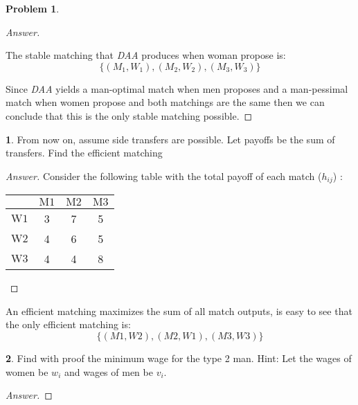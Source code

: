\documentclass{article}
\theoremstyle{definition}
\newtheorem{problem}{Problem}
\newtheorem{subproblem}{}[problem]
\begin{document}
\begin{problem}
\begin{proof}[Answer]
\begin{center}
\end{center}

The stable matching that \textit{DAA} produces when woman propose is:
$$\{(M_1, W_1), (M_2, W_2), (M_3, W_3)\}$$

Since \textit{DAA} yields a man-optimal match when men proposes and a man-pessimal match when women propose and both matchings are the same then we can conclude that this is the only stable matching possible.

\end{proof}

\begin{subproblem}
From now on, assume side transfers are possible. Let payoffs be the sum of transfers. Find the efficient matching
\end{subproblem}
\begin{proof}[Answer]
Consider the following table with the total payoff of each match ($h_{ij}$) :

\begin{center}
\begin{tabular}{|c|c|c|c|}
\hline & $\mathrm{M} 1$ & $\mathrm{M} 2$ & $\mathrm{M} 3$ \\
\hline $\mathrm{W} 1$ & 3 & 7 & 5 \\
\hline $\mathrm{W} 2$ & 4 & 6 & 5 \\
\hline $\mathrm{W} 3$ & 4 & 4 & 8 \\
\hline
\end{tabular}
\end{center}
\end{proof}

An efficient matching maximizes the sum of all match outputs, is easy to see that the only efficient matching is:
$$\{(M1,W2), (M2, W1), (M3,W3)\}$$

\begin{subproblem}
Find with proof the minimum wage for the type 2 man. Hint: Let the wages of women be $w_{i}$ and wages of men be $v_{i} .$
\end{subproblem}
\begin{proof}[Answer]


\end{proof}
\end{problem}
\end{document}
